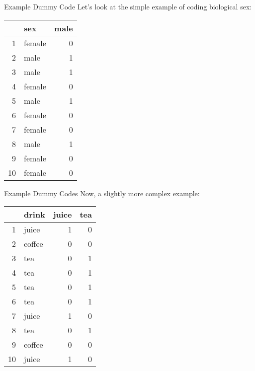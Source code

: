 \documentclass{beamer}\usepackage[]{graphicx}\usepackage[]{color}
\begin{document}
\begin{frame}{Example Dummy Code} 
 Let's look at the simple example of coding biological sex: 
\begin{table}[ht]
\centering
\begin{tabular}{rlr}
  \toprule
 & sex & male \\ 
  \midrule
1 & female & 0 \\ 
  2 & male & 1 \\ 
  3 & male & 1 \\ 
  4 & female & 0 \\ 
  5 & male & 1 \\ 
  6 & female & 0 \\ 
  7 & female & 0 \\ 
  8 & male & 1 \\ 
  9 & female & 0 \\ 
  10 & female & 0 \\ 
   \bottomrule
\end{tabular}
\end{table}


\end{frame}


\begin{frame}{Example Dummy Codes} 
 Now, a slightly more complex  example: 
\begin{table}[ht]
\centering
\begin{tabular}{rlrr}
  \toprule
 & drink & juice & tea \\ 
  \midrule
1 & juice & 1 & 0 \\ 
  2 & coffee & 0 & 0 \\ 
  3 & tea & 0 & 1 \\ 
  4 & tea & 0 & 1 \\ 
  5 & tea & 0 & 1 \\ 
  6 & tea & 0 & 1 \\ 
  7 & juice & 1 & 0 \\ 
  8 & tea & 0 & 1 \\ 
  9 & coffee & 0 & 0 \\ 
  10 & juice & 1 & 0 \\ 
   \bottomrule
\end{tabular}
\end{table}


\end{frame}
\end{document}
